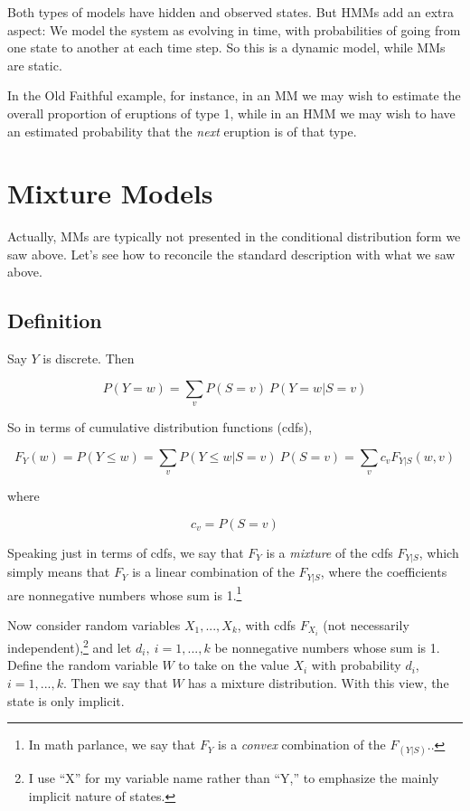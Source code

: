 \documentclass[11pt]{article}
\begin{document}
Both types of models have hidden and observed states.  But HMMs add an
extra aspect:  We model the system as evolving in time, with
probabilities of going from one state to another at each time step.  So
this is a dynamic model, while MMs are static. 

In the Old Faithful example, for instance, in an MM we may wish to
estimate the overall proportion of eruptions of type 1, while in an
HMM we may wish to have an estimated probability that the \textit{next}
eruption is of that type.

\section{Mixture Models}

Actually, MMs are typically not presented in the conditional distribution
form we saw above.  Let's see how to reconcile the standard description
with what we saw above.

\subsection{Definition}
\label{mixdef}

Say $Y$ is discrete.  Then

\begin{equation}
P(Y = w) = \sum_{v} P(S = v) ~ P(Y = w | S = v)
\end{equation}

So in terms of cumulative distribution functions (cdfs),

\begin{equation}
F_Y(w) = P(Y \leq w) = 
\sum_{v} P(Y \leq w | S = v) ~ P(S = v) =
\sum_{v} c_v F_{Y|S}(w,v)
\end{equation}

where 

\begin{equation}
c_v = P(S = v)
\end{equation}

Speaking just in terms of cdfs, we say that $F_Y$ is a \textit{mixture}
of the cdfs $F_{Y|S}$, which simply means that $F_Y$ is a linear
combination of the $F_{Y|S}$, where the coefficients are nonnegative
numbers whose sum is 1.\footnote{In math parlance, we say that $F_Y$ is
a \textit{convex} combination of the $F_{(Y|S)}$..}

Now consider random variables $X_1,...,X_k$, with cdfs $F_{X_i}$ (not
necessarily independent),\footnote{I use ``X'' for my variable name
rather than ``Y,'' to emphasize the mainly implicit nature of states.}
and let $d_i, ~ i=1,...,k$ be nonnegative
numbers whose sum is 1.  Define the random variable $W$ to take on the
value $X_i$ with probability $d_i$, $i=1,...,k$.  Then we say that $W$
has a mixture distribution.  With this view, the state is only implicit.
\end{document}
